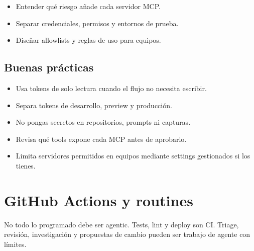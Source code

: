 \documentclass[11pt,a4paper]{book}
\begin{document}
\begin{itemize}\item Entender qué riesgo añade cada servidor MCP.\end{itemize}
\begin{itemize}\item Separar credenciales, permisos y entornos de prueba.\end{itemize}
\begin{itemize}\item Diseñar allowlists y reglas de uso para equipos.\end{itemize}
\section{Buenas prácticas}
\begin{itemize}\item Usa tokens de solo lectura cuando el flujo no necesita escribir.\end{itemize}
\begin{itemize}\item Separa tokens de desarrollo, preview y producción.\end{itemize}
\begin{itemize}\item No pongas secretos en repositorios, prompts ni capturas.\end{itemize}
\begin{itemize}\item Revisa qué tools expone cada MCP antes de aprobarlo.\end{itemize}
\begin{itemize}\item Limita servidores permitidos en equipos mediante settings gestionados si los tienes.\end{itemize}
\chapter{GitHub Actions y routines}
No todo lo programado debe ser agentic. Tests, lint y deploy son CI. Triage, revisión, investigación y propuestas de cambio pueden ser trabajo de agente con límites.
\end{document}
